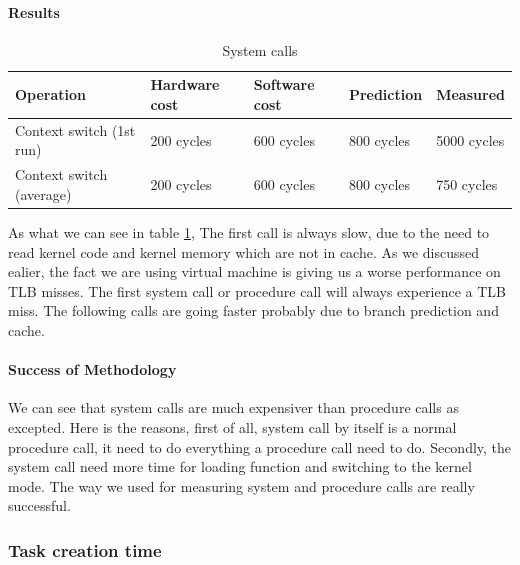 \paragraph{Results}
\begin{table} [h]
\begin{center}
\begin{tabular}{| l | l | l | l | l |}
\hline
Operation 				& Hardware cost & Software cost & Prediction & Measured \\
\hline
Context switch (1st run) & 200 cycles & 600 cycles & 800 cycles & 5000 cycles\\
\hline
Context switch (average) & 200 cycles & 600 cycles & 800 cycles & 750 cycles\\
\hline
\end{tabular}
\end{center}

\caption{System calls\label {tab:sysCall}}
\end{table}


As what we can see in table \ref{tab:sysCall}, The first call is always slow, due to the need to read kernel code and
kernel memory which are not in cache. As we discussed ealier, the fact we are using virtual machine is giving us a worse performance on TLB misses. The first system call or procedure call will always experience a TLB miss.
The following calls are going faster probably due to branch prediction and
cache.

\paragraph{Success of Methodology}
We can see that system calls are much expensiver than procedure calls as excepted. Here is the reasons, first of all, system call by itself is a normal procedure call, it need to do everything a procedure call need to do. Secondly, the system call need more time for loading function and switching to the kernel mode. The way we used for measuring system and procedure calls are really successful.

\subsubsection{Task creation time}
